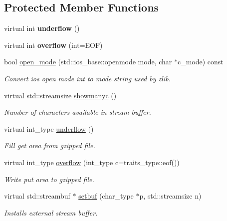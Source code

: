 \subsection*{Protected Member Functions}
\begin{DoxyCompactItemize}
\item 
\mbox{\label{classgzfilebuf_a2f7159c91a60bee86546283caf8de212}} 
virtual int {\bfseries underflow} ()
\item 
\mbox{\label{classgzfilebuf_a7a10ee573ebe6777c8a64e316569f694}} 
virtual int {\bfseries overflow} (int=E\+OF)
\item 
bool \hyperlink{classgzfilebuf_ab0c2c304183e591706681af26add3da2}{open\+\_\+mode} (std\+::ios\+\_\+base\+::openmode mode, char $\ast$c\+\_\+mode) const
\begin{DoxyCompactList}\small\item\em Convert ios open mode int to mode string used by zlib. \end{DoxyCompactList}\item 
virtual std\+::streamsize \hyperlink{classgzfilebuf_afbe2418d8a9c3f4a321cc26aa4ae5f7a}{showmanyc} ()
\begin{DoxyCompactList}\small\item\em Number of characters available in stream buffer. \end{DoxyCompactList}\item 
virtual int\+\_\+type \hyperlink{classgzfilebuf_a23768f9935022e54608c53173f0047c0}{underflow} ()
\begin{DoxyCompactList}\small\item\em Fill get area from gzipped file. \end{DoxyCompactList}\item 
virtual int\+\_\+type \hyperlink{classgzfilebuf_a425a4b0d1890abff8f83d7a5aae344b4}{overflow} (int\+\_\+type c=traits\+\_\+type\+::eof())
\begin{DoxyCompactList}\small\item\em Write put area to gzipped file. \end{DoxyCompactList}\item 
virtual std\+::streambuf $\ast$ \hyperlink{classgzfilebuf_a856bc21f7cfc6ba43f017c9c3f0d5f81}{setbuf} (char\+\_\+type $\ast$p, std\+::streamsize n)
\begin{DoxyCompactList}\small\item\em Installs external stream buffer. \end{DoxyCompactList}\item 

\end{DoxyCompactItemize}
